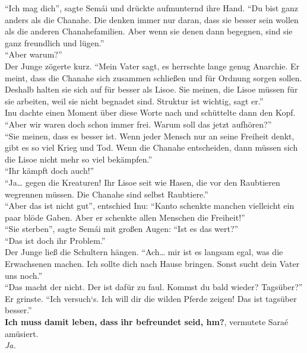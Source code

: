 ``Ich mag dich'', sagte Semái und drückte aufmunternd ihre Hand. ``Du bist ganz anders als die 
Chanahe. Die denken immer nur daran, dass sie besser sein wollen als die anderen Chanahefamilien. 
Aber wenn sie denen dann begegnen, sind sie ganz freundlich und lügen.''\\
``Aber warum?''\\
Der Junge zögerte kurz. ``Mein Vater sagt, es herrschte lange genug Anarchie. Er meint, dass die 
Chanahe sich zusammen schließen und für Ordnung sorgen sollen. Deshalb halten sie sich auf für 
besser als Lisoe. Sie meinen, die Lisoe müssen für sie arbeiten, weil sie nicht begnadet sind. 
Struktur ist wichtig, sagt er.''\\
Inu dachte einen Moment über diese Worte nach und schüttelte dann den Kopf. ``Aber wir waren doch 
schon immer frei. Warum soll das jetzt aufhören?''\\
``Sie meinen, dass es besser ist. Wenn jeder Mensch nur an seine Freiheit denkt, gibt es so viel 
Krieg und Tod. Wenn die Chanahe entscheiden, dann müssen sich die Lisoe nicht mehr so viel 
bekämpfen.''\\
``Ihr kämpft doch auch!''\\
``Ja… gegen die Kreaturen! Ihr Lisoe seit wie Hasen, die vor den Raubtieren wegrennen müssen. 
Die Chanahe sind selbst Raubtiere.''\\
``Aber das ist nicht gut'', entschied Inu: ``Kanto schenkte manchen vielleicht ein paar blöde 
Gaben. Aber er schenkte allen Menschen die Freiheit!''\\
``Sie sterben'', sagte Semái mit großen Augen: ``Ist es das wert?''\\
``Das ist doch ihr Problem.''\\
Der Junge ließ die Schultern hängen. ``Ach… mir ist es langsam egal, was die Erwachsenen machen. 
Ich sollte dich nach Hause bringen. Sonst sucht dein Vater uns noch.''\\
``Das macht der nicht. Der ist dafür zu faul. Kommst du bald wieder? Tagsüber?''\\
Er grinste. ``Ich versuch‘s. Ich will dir die wilden Pferde zeigen! Das ist tagsüber besser.''\\
\textbf{Ich muss damit leben, dass ihr befreundet seid, hm?}, vermutete Saraé amüsiert.\\
\textit{Ja.}\\